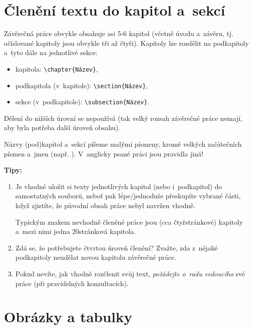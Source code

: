 \section{Členění textu do kapitol a~sekcí}
Závěrečná práce obvykle obsahuje asi 5-6 kapitol (včetně úvodu a~závěru, tj. očíslované kapitoly jsou obvykle tři až čtyři). Kapitoly lze rozdělit na podkapitoly a~tyto dále na jednotlivé sekce:
\begin{itemize}
\item kapitola: {\texttt{\textbackslash chapter\{Název\}}},
\item podkapitola (v~kapitole): {\texttt{\textbackslash section\{Název\}}},
\item sekce (v~podkapitole):  {\texttt{\textbackslash subsection\{Název\}}}.
\end{itemize}
Dělení do nižších úrovní se nepoužívá (tak velký rozsah závěrečné práce nemají, aby byla potřeba další úroveň obsahu). 
\par
Názvy (pod)kapitol a~sekcí píšeme malými písmeny, kromě velkých začátečních písmen a~jmen (např. ). V~anglicky psané práci jsou pravidla jiná!
\par 
{\bf Tipy:} 
\begin{enumerate}
\item Je vhodné uložit si texty jednotlivých kapitol (nebo i~podkapitol) do samostatných souborů, neboť pak lépe/jednoduše přeskupíte vybrané části, když zjistíte, že původní obsah práce nebyl navržen vhodně. \par Typickým znakem nevhodně členěné práce jsou  (cca čtyřstránkové) kapitoly a~mezi nimi jedna  20stránková kapitola.
\item Zdá se, že potřebujete čtvrtou úroveň členění? Zvažte, zda z~nějaké podkapitoly neudělat novou kapitolu závěrečné práce.
\item Pokud nevíte, jak vhodně rozčlenit svůj text, {\em požádejte o~radu vedoucího\/} své práce (při pravidelných konzultacích).
\end{enumerate}

\section{Obrázky a tabulky}\label{sekceObrTab}

